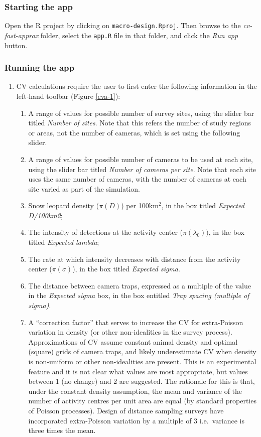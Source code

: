 \documentclass[a4paper,11pt]{article} %
\begin{document}
\subsubsection{Starting the app}
Open the R project by clicking on \texttt{macro-design.Rproj}. Then browse to the \textit{cv-fast-approx} folder, select the \texttt{app.R} file in that folder, and click the \textit{Run app} button. 

\subsubsection{Running the app}

\begin{enumerate}
\item CV calculations require the user to first enter the following information in the left-hand toolbar (Figure \ref{cva-1}):
\begin{enumerate}
\item A range of values for possible number of survey sites, using the slider bar titled \textit{Number of sites}. Note that this refers the number of study regions or areas, not the number of cameras, which is set using the following slider.
\item A range of values for possible number of cameras to be used at each site, using the slider bar titled \textit{Number of cameras per site}. Note that each site uses the same number of cameras, with the number of cameras at each site varied as part of the simulation.
\item Snow leopard density ($\pi(D)$) per 100km$^2$, in the box titled \textit{Expected D/100km2};
\item The intensity of detections at the activity center ($\pi(\lambda_0))$, in the box titled \textit{Expected lambda};
\item The rate at which intensity decreases with distance from the activity center ($\pi(\sigma)$), in the box titled \textit{Expected sigma}. 
\item The distance between camera traps, expressed as a multiple of the value in the \textit{Expected sigma} box, in the box entitled \textit{Trap spacing (multiple of sigma)}.
\item A ``correction factor'' that serves to increase the CV for extra-Poisson variation in density (or other non-idealities in the survey process). Approximations of CV assume constant animal density and optimal (square) grids of camera traps, and likely underestimate CV when density is non-uniform or other non-idealities are present. This is an experimental feature and it is not clear what values are most appropriate, but values between 1 (no change) and 2 are suggested. The rationale for this is that, under the constant density assumption, the mean and variance of the number of activity centres per unit area are equal (by standard properties of Poisson processes). Design of distance sampling surveys have incorporated extra-Poisson variation by a multiple of 3 i.e.\ variance is three times the mean. 

\end{enumerate}
\end{enumerate}
\end{document}
